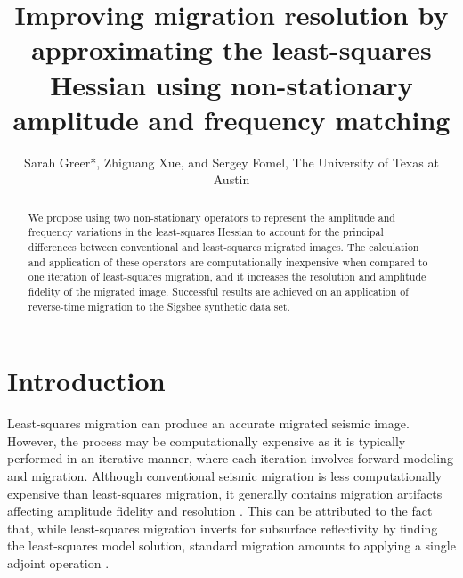 \title{Improving migration resolution by approximating the least-squares Hessian using non-stationary amplitude and frequency matching}

\usetikzlibrary{arrows,automata}
\author{Sarah Greer*, Zhiguang Xue, and Sergey Fomel, The University of Texas at Austin}
\relax{}

\newcommand*{\tran}{^{\mkern-1.5mu\mathsf{T}}}
\maketitle
{}
\begin{abstract}
    We propose using two non-stationary operators to represent the amplitude and frequency variations in the least-squares Hessian to account for the principal differences between conventional and least-squares migrated images.
    The calculation and application of these operators are computationally inexpensive when compared to one iteration of least-squares migration, and it increases the resolution and amplitude fidelity of the migrated image.
    Successful results are achieved on an application of reverse-time migration to the Sigsbee synthetic data set.
\end{abstract}

\section{Introduction}
    Least-squares migration can produce an accurate migrated seismic image.
    However, the process may be computationally expensive as it is typically performed in an iterative manner, where each iteration involves forward modeling and migration. 
    Although conventional seismic migration is less computationally expensive than least-squares migration, it generally contains migration artifacts affecting amplitude fidelity and resolution \cite[]{lsamp,pwlsrtm}.
    This can be attributed to the fact that, while least-squares migration inverts for subsurface reflectivity by finding the least-squares model solution, standard migration amounts to applying a single adjoint operation \cite[]{pvi}. 

